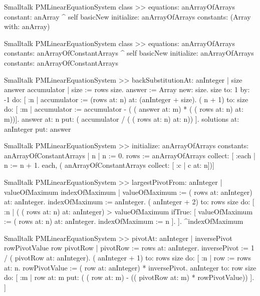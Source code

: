 \begin{displaycode}{Smalltalk}
PMLinearEquationSystem class >> equations: anArrayOfArrays constant: anArray 
  ^ self basicNew
      initialize: anArrayOfArrays 
      constants: (Array with: anArray)
\end{displaycode}

\begin{displaycode}{Smalltalk}
PMLinearEquationSystem class >> equations: anArrayOfArrays constants: anArrayOfConstantArrays
  ^ self basicNew 
      initialize: anArrayOfArrays
      constants: anArrayOfConstantArrays
\end{displaycode}

\begin{displaycode}{Smalltalk}
PMLinearEquationSystem >> backSubstitutionAt: anInteger
    | size answer accumulator |
    size := rows size.
    answer := Array new: size.
    size to: 1 by: -1 do:
        [ :n |
          accumulator := (rows at: n) at: (anInteger + size).
          ( n + 1) to: size
            do: [ :m | accumulator := accumulator - ( ( answer at: m) 
                                           * ( ( rows at: n) at: m))].
          answer at: n put: ( accumulator / ( ( rows at: n) at: n)) ].
    solutions at: anInteger put: answer
\end{displaycode}

\begin{displaycode}{Smalltalk}
PMLinearEquationSystem >> initialize: anArrayOfArrays constants: anArrayOfConstantArrays
    | n |
    n := 0.
    rows := anArrayOfArrays collect: [ :each | n := n + 1. each, ( 
                   anArrayOfConstantArrays collect: [ :c | c at: n])]
\end{displaycode}

\begin{displaycode}{Smalltalk}
PMLinearEquationSystem >> largestPivotFrom: anInteger
    | valueOfMaximum indexOfMaximum |
    valueOfMaximum := ( rows at: anInteger) at: anInteger.
    indexOfMaximum := anInteger.
    ( anInteger + 2) to: rows size do:
        [ :n |
          ( ( rows at: n) at: anInteger) > valueOfMaximum
                ifTrue: [ valueOfMaximum := ( rows at: n) at: 
                                                            anInteger.
                             indexOfMaximum := n ].
        ].
    ^indexOfMaximum 
\end{displaycode}

\begin{displaycode}{Smalltalk}
PMLinearEquationSystem >> pivotAt: anInteger
    | inversePivot rowPivotValue row pivotRow |
    pivotRow := rows at: anInteger.
    inversePivot := 1 / ( pivotRow at: anInteger).
    ( anInteger + 1) to: rows size do:
        [ :n |
          row := rows at: n.
          rowPivotValue := ( row at: anInteger) * inversePivot.
          anInteger to: row size do:
            [ :m |
              row at: m put: ( ( row at: m) - (( pivotRow at: m) * 
                                                      rowPivotValue)) ].
        ]
\end{displaycode}


